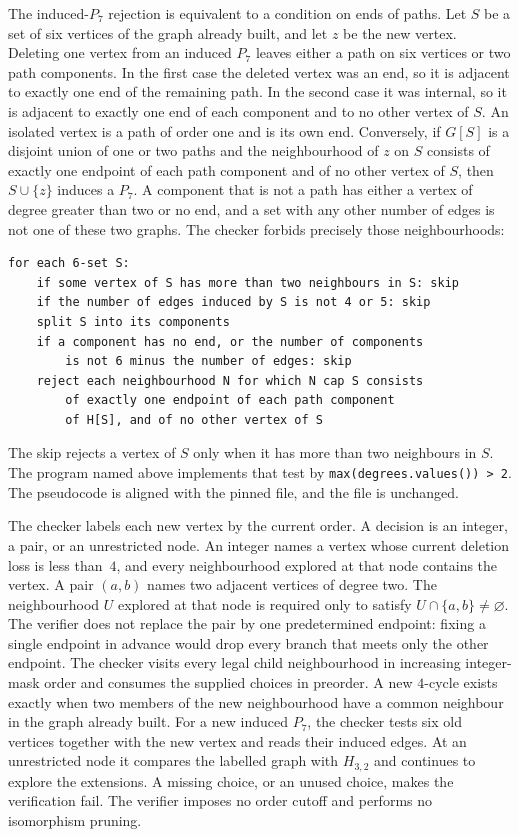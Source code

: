 \documentclass[ASNA]{USG}
\theoremstyle{WBstyletwo}
\numberwithin{equation}{section}
\begin{document}
The induced-$P_7$ rejection is equivalent to a condition on ends of paths. Let $S$ be a set of six vertices of the graph already built, and let $z$ be the new vertex. Deleting one vertex from an induced $P_7$ leaves either a path on six vertices or two path components. In the first case the deleted vertex was an end, so it is adjacent to exactly one end of the remaining path. In the second case it was internal, so it is adjacent to exactly one end of each component and to no other vertex of $S$. An isolated vertex is a path of order one and is its own end. Conversely, if $G[S]$ is a disjoint union of one or two paths and the neighbourhood of $z$ on $S$ consists of exactly one endpoint of each path component and of no other vertex of $S$, then $S\cup\{z\}$ induces a $P_7$. A component that is not a path has either a vertex of degree greater than two or no end, and a set with any other number of edges is not one of these two graphs. The checker forbids precisely those neighbourhoods:

\begin{verbatim}
for each 6-set S:
    if some vertex of S has more than two neighbours in S: skip
    if the number of edges induced by S is not 4 or 5: skip
    split S into its components
    if a component has no end, or the number of components
        is not 6 minus the number of edges: skip
    reject each neighbourhood N for which N cap S consists
        of exactly one endpoint of each path component
        of H[S], and of no other vertex of S
\end{verbatim}

The skip rejects a vertex of $S$ only when it has more than two neighbours in $S$. The program named above implements that test by \texttt{max(degrees.values()) > 2}. The pseudocode is aligned with the pinned file, and the file is unchanged.

The checker labels each new vertex by the current order. A decision is an integer, a pair, or an unrestricted node. An integer names a vertex whose current deletion loss is less than~$4$, and every neighbourhood explored at that node contains the vertex. A pair $(a,b)$ names two adjacent vertices of degree two. The neighbourhood $U$ explored at that node is required only to satisfy $U\cap\{a,b\}\neq\varnothing$. The verifier does not replace the pair by one predetermined endpoint: fixing a single endpoint in advance would drop every branch that meets only the other endpoint. The checker visits every legal child neighbourhood in increasing integer-mask order and consumes the supplied choices in preorder. A new $4$-cycle exists exactly when two members of the new neighbourhood have a common neighbour in the graph already built. For a new induced $P_7$, the checker tests six old vertices together with the new vertex and reads their induced edges. At an unrestricted node it compares the labelled graph with $H_{3,2}$ and continues to explore the extensions. A missing choice, or an unused choice, makes the verification fail. The verifier imposes no order cutoff and performs no isomorphism pruning.
\end{document}
